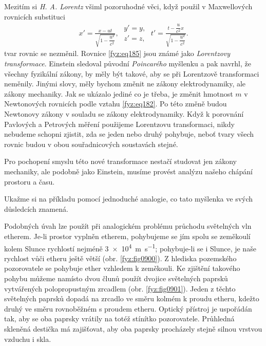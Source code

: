     Mezitím si \emph{H. A. Lorentz} všiml pozoruhodné věci, když použil v Maxwellových rovnicích
    substituci
    \begin{gather}\label{fyz:eq185}
      x' = \frac{x - ut}{\sqrt{1-\dfrac{u^2}{c^2}}}, \;
      \begin{array}{c}      
        y' = y, \\ z' = z,                         
      \end{array}\;
      t' = \frac{t-\dfrac{u}{c^2}x}{\sqrt{1-\dfrac{u^2}{c^2}}}. 
    \end{gather} 
    tvar rovnic se nezměnil. Rovnice \ref{fyz:eq185} jsou známé jako \emph{Lorentzovy 
    transformace}. Einstein sledoval původní \emph{Poincarého} myšlenku a pak navrhl, že všechny 
    fyzikální zákony, by měly být takové, aby se při Lorentzově transformaci neměnily. Jinými 
    slovy, měly bychom změnit ne zákony elektrodynamiky, ale zákony mechaniky. Jak se ukázalo 
    jediné co je třeba, je změnit hmotnost \(m\) v Newtonových rovnicích podle vztahu 
    \ref{fyz:eq182}. Po této změně budou Newtonovy zákony v souladu se zákony elektrodynamiky. Když 
    k porovnání Pavlových a Petrových měření použijeme Lorentzovu transformaci, nikdy nebudeme 
    schopni zjistit, zda se jeden nebo druhý pohybuje, neboť tvary všech rovnic budou v obou 
    souřadnicových soustavách stejné. 
    
    Pro pochopení smyslu této nové transformace nestačí studovat jen zákony mechaniky, ale podobně 
    jako Einstein, musíme provést analýzu našeho chápání prostoru a času. 

    Ukažme si na příkladu pomocí jednoduché analogie, co tato myšlenka ve svých důsledcích znamená.
    

    Podobných úvah lze použít při analogickém problému průchodu světelných vln etherem. Je-li
    prostor vyplněn etherem, pohybujeme se jím spolu se zeměkoulí kolem Slunce rychlostí nejméně
    \SI{3e4}{\metre\per\second}; pohybuje-li se i Slunce, je naše rychlost vůči etheru ještě větší
    (obr. \ref{fyz:fig0900}). Z hlediska pozemského pozorovatele se pohybuje ether vzhledem k
    zeměkouli. Ke zjištění takového pohybu můžeme namísto dvou člunů použít dvojice světelných
    paprsků vytvářených polopropustným zrcadlem (obr. \ref{fyz:fig0901}). Jeden z těchto světelných
    paprsků dopadá na zrcadlo ve směru kolmém k proudu etheru, kdežto druhý ve směru rovnoběžném s
    proudem etheru. Optický přístroj je uspořádán tak, aby se oba paprsky vrátily na totéž stínítko
    pozorovatele. Průhledná skleněná destička má zajišťovat, aby oba paprsky procházely stejně
    silnou vrstvou vzduchu i skla.

